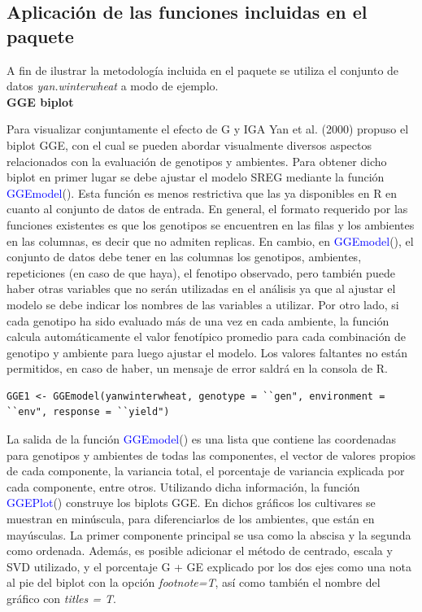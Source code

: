 \subsection{Aplicación de las funciones incluidas en el paquete}

A fin de ilustrar la metodología incluida en el paquete se utiliza el conjunto de datos \emph{yan.winterwheat} a modo de ejemplo.\\


\textbf{GGE biplot}

Para visualizar conjuntamente el efecto de G y IGA Yan et al. (2000) propuso el biplot GGE, con el cual se pueden abordar visualmente diversos aspectos relacionados con la evaluación de genotipos y ambientes. Para obtener dicho biplot en primer lugar se debe ajustar el modelo SREG mediante la función \textcolor{blue}{GGEmodel}(). Esta función es menos restrictiva que las ya disponibles en R en cuanto al conjunto de datos de entrada. En general, el formato requerido por las funciones existentes es que los genotipos se encuentren en las filas y los ambientes en las columnas, es decir que no admiten replicas. En cambio, en \textcolor{blue}{GGEmodel}(), el conjunto de datos debe tener en las columnas los genotipos, ambientes, repeticiones (en caso de que haya), el fenotipo observado, pero también puede haber otras variables que no serán utilizadas en el análisis ya que al ajustar el modelo se debe indicar los nombres de las variables a utilizar. Por otro lado, si cada genotipo ha sido evaluado más de una vez en cada ambiente, la función calcula automáticamente el valor fenotípico promedio para cada combinación de genotipo y ambiente para luego ajustar el modelo. Los valores faltantes no están permitidos, en caso de haber, un mensaje de error saldrá en la consola de R.\\  
\begin{tcolorbox}[colframe=aurometalsaurus,colback=backcolour,colbacklower=white,
   				width=1\linewidth,
    			height=0.1\linewidth,
    			boxsep=-3mm]
\begin{lstlisting}
GGE1 <- GGEmodel(yanwinterwheat, genotype = ``gen", environment = ``env", response = ``yield")
\end{lstlisting}
\end{tcolorbox}
La salida de la función \textcolor{blue}{GGEmodel}() es una lista que contiene las coordenadas para genotipos y ambientes de todas las componentes, el vector de valores propios de cada componente, la variancia total, el porcentaje de variancia explicada por cada componente, entre otros. Utilizando dicha información, la función \textcolor{blue}{GGEPlot}() construye los biplots GGE. En dichos gráficos los cultivares se muestran en minúscula, para diferenciarlos de los ambientes, que están en mayúsculas. La primer componente principal se usa como la abscisa y la segunda como ordenada. Además, es posible adicionar el método de centrado, escala y SVD utilizado, y el porcentaje G + GE explicado por los dos ejes como una nota al pie del biplot con la opción \emph{footnote=T}, así como también el nombre del gráfico con \emph{titles = T}.


